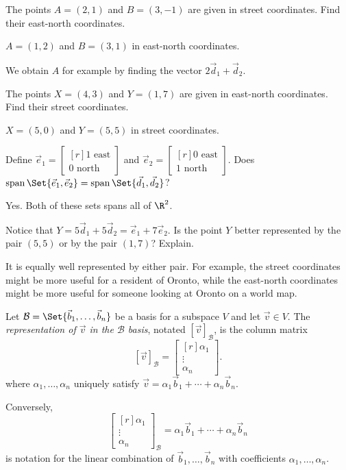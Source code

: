 \documentclass{problemset}
\DeclareMathOperator{\Span}{span}
\newcommand{\mat}[1]{\begin{bmatrix*}[r]#1\end{bmatrix*}}
\newcommand{\displayonlynewpage}{\begin{displayonly}\newpage\end{displayonly}}
\begin{document}
	\begin{parts}
		\item The points $A=(2,1)$ and $B=(3,-1)$ are given in street coordinates.
			Find their east-north coordinates.
			\begin{solution}
				$A=(1,2)$ and $B=(3,1)$ in east-north coordinates.

				We obtain $A$ for example by finding the vector $2\vec d_1+\vec d_2$.
			\end{solution}
		\item The points $X=(4,3)$ and $Y=(1,7)$ are given in east-north coordinates.
			Find their street coordinates.
			\begin{solution}[inline]
				$X=(5,0)$ and $Y=(5,5)$ in street coordinates.
			\end{solution}
		\item Define $\vec e_1=\mat{1\text{ east}\\0\text{ north}}$ and
			$\vec e_2=\mat{0\text{ east}\\1\text{ north}}$.
			Does $\Span\Set{\vec e_1,\vec e_2} = \Span\Set{\vec d_1,\vec d_2}$?
			\begin{solution}
				Yes. Both of these sets spans all of $\R^2$.
			\end{solution}
		\item Notice that $Y=5\vec d_1+5\vec d_2 = \vec e_1+7\vec e_2$. Is the point $Y$
			better represented by the pair $(5,5)$ or by the pair $(1,7)$? Explain.
			\begin{solution}
				It is equally well represented by either pair. For example, the
				street coordinates might be more useful for a resident of Oronto,
				while the east-north coordinates might be more useful for someone
				looking at Oronto on a world map.
			\end{solution}
	\end{parts}

\displayonlynewpage
	\begin{definition}
		Let $\mathcal B=\Set{\vec b_1,\ldots,\vec b_n}$ be a basis for a subspace $V$
		and let $\vec v\in V$. The \emph{representation of $\vec v$ in the $\mathcal B$
		basis}, notated $[\vec v]_{\mathcal B}$,
		is the column matrix
		\[
			[\vec v]_{\mathcal B} = \mat{\alpha_1\\\vdots\\\alpha_n}.
		\]
		where $\alpha_1,\ldots,\alpha_n$ uniquely satisfy $
			\vec v=\alpha_1\vec b_1+\cdots+\alpha_n\vec b_n.
		$

		Conversely,
		\[
			\mat{\alpha_1\\\vdots\\\alpha_n}_{\mathcal B}
			= \alpha_1\vec b_1+\cdots +\alpha_n\vec b_n
		\]
		is notation for the linear combination of $\vec b_1,\ldots,\vec b_n$ with
		coefficients $\alpha_1,\ldots,\alpha_n$.
	\end{definition}
\end{document}
